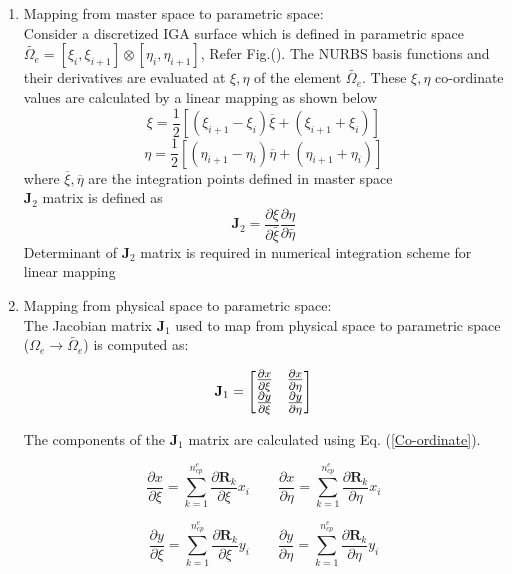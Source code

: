 \documentclass[12pt]{article}
\begin{document}
\begin{enumerate}[leftmargin=*]
\item Mapping from master space to parametric space: \\
Consider a discretized IGA surface which is defined in parametric space $\widetilde{\Omega_e}=[\xi_i,\xi_{i+1}]\otimes[\eta_i,\eta_{i+1}]$, Refer Fig.(). The NURBS basis functions and their derivatives are evaluated at $\xi,\eta$ of the element $\widetilde{\Omega_e}$. These $\xi,\eta$ co-ordinate values are calculated by a linear mapping as shown below
\begin{equation}
\xi=\frac{1}{2}[(\xi_{i+1}-\xi_{i})\overline{\xi}+(\xi_{i+1}+\xi_{i})]
\end{equation} 
\begin{equation}
\eta=\frac{1}{2}[(\eta_{i+1}-\eta_{i})\overline{\eta}+(\eta_{i+1}+\eta_{i})]
\end{equation}
where $\overline{\xi},\overline{\eta}$ are the integration points defined in master space \\
$\textbf{J}_2$ matrix is defined as 
\begin{equation}
\textbf{J}_2 = \frac{\partial\xi}{\partial \bar{\xi}} \frac{\partial\eta}{\partial \bar{\eta}}
\end{equation} 
Determinant of $\textbf{J}_2$ matrix is required in numerical integration scheme for linear mapping 


\item Mapping from physical space to parametric space: \\
The Jacobian matrix $\textbf{J}_1$ used to map from physical space to parametric space ($\Omega_e \rightarrow \widetilde{\Omega_e}$) is computed as:

\begin{equation} \label{J1Matrix1}
\textbf{J}_1 =
\large
\begin{bmatrix}
\frac{\partial x}{\partial \xi} &\frac{\partial x}{\partial \eta} \\
\frac{\partial y}{\partial \xi} &\frac{\partial y}{\partial \eta} \\
\end{bmatrix} 
\end{equation}

The components of the $\textbf{J}_1$ matrix are calculated using Eq. (\ref{Co-ordinate}).

\begin{equation}
\frac{\partial x}{\partial \xi} = \sum_{k=1}^{n_{cp}^e} \frac{\partial \textbf{R}_k}{\partial \xi} x_i
\qquad
\frac{\partial x}{\partial \eta} = \sum_{k=1}^{n_{cp}^e} \frac{\partial \textbf{R}_k}{\partial \eta} x_i
\end{equation} 

\begin{equation}
\frac{\partial y}{\partial \xi} = \sum_{k=1}^{n_{cp}^e} \frac{\partial \textbf{R}_k}{\partial \xi} y_i
\qquad
\frac{\partial y}{\partial \eta} = \sum_{k=1}^{n_{cp}^e} \frac{\partial \textbf{R}_k}{\partial \eta} y_i
\end{equation}

\end{enumerate}
\end{document}
